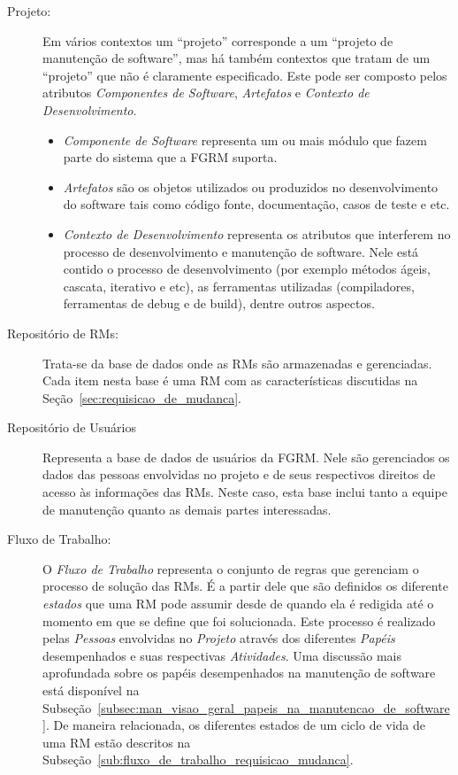 \begin{description}
    \item[Projeto:] Em vários contextos um ``projeto'' corresponde a um
        ``projeto de manutenção de software'', mas há também contextos que
        tratam de um ``projeto'' que não é claramente especificado. Este pode
        ser composto pelos atributos \textit{Componentes de Software},
        \textit{Artefatos} e \textit{Contexto de Desenvolvimento}.
		\begin{itemize}
			\item  \textit{Componente de Software} representa um ou mais módulo
				que fazem parte do sistema que a FGRM suporta.
			\item \textit{Artefatos} são os objetos utilizados ou produzidos no
				desenvolvimento do software tais como código fonte,
				documentação, casos de teste e etc.
			\item \textit{Contexto de Desenvolvimento} representa os atributos
				que interferem no processo de desenvolvimento e manutenção de
				software. Nele está contido o processo de desenvolvimento (por
				exemplo métodos ágeis, cascata, iterativo e etc), as ferramentas
				utilizadas (compiladores, ferramentas de debug e de build), dentre
                outros aspectos.
		\end{itemize}
	\item[Repositório de RMs:] Trata-se da base de dados onde as RMs são
		armazenadas e gerenciadas. Cada item nesta base é uma RM com as
		características discutidas na Seção~\ref{sec:requisicao_de_mudanca}.
    \item[Repositório de Usuários] Representa a base de dados de usuários da
        FGRM\@. Nele são gerenciados os dados das pessoas envolvidas no projeto
        e de seus respectivos direitos de acesso às informações das RMs. Neste
        caso, esta base inclui tanto a equipe de manutenção quanto as demais
        partes interessadas.
	\item[Fluxo de Trabalho:] O \textit{Fluxo de Trabalho} representa o conjunto
		de regras que gerenciam o processo de solução das RMs\@. É a partir
		dele que são definidos os diferente \textit{estados} que uma RM pode
		assumir desde de quando ela é redigida até o momento em que se define
		que foi solucionada. Este processo é realizado pelas \textit{Pessoas}
        envolvidas no \textit{Projeto} através dos diferentes \textit{Papéis}
        desempenhados e suas respectivas \textit{Atividades}. Uma discussão
        mais aprofundada sobre os papéis desempenhados na manutenção de
        software está disponível na
        Subseção~\ref{subsec:man_visao_geral_papeis_na_manutencao_de_software}.
        De maneira relacionada, os diferentes estados de um ciclo de vida de
        uma RM estão descritos na
        Subseção~\ref{sub:fluxo_de_trabalho_requisicao_mudanca}.
    \end{description}

